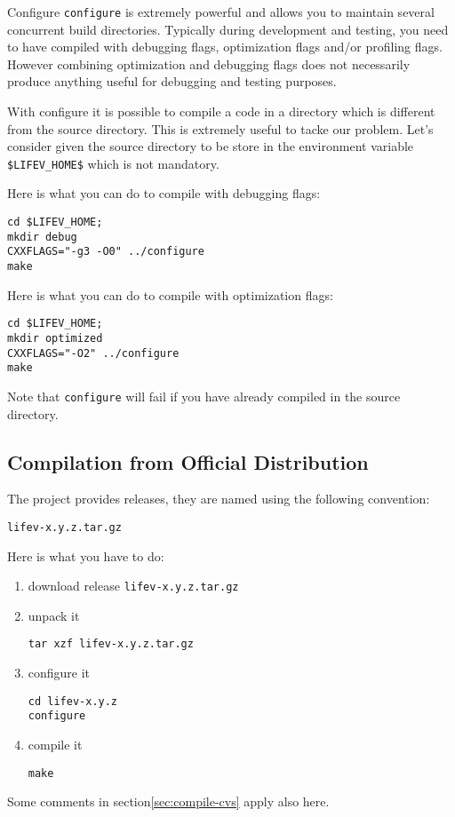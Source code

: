 \begin{hint}{Configure}
  \verb!configure! is extremely powerful and allows you to maintain
  several concurrent build directories. Typically during development
  and testing, you need to have \lifev compiled with debugging flags,
  optimization flags and/or profiling flags. However combining
  optimization and debugging flags does not necessarily produce
  anything useful for debugging and testing purposes.
  
  With configure it is possible to compile a code in a directory which
  is different from the source directory. This is extremely useful to
  tacke our problem. Let's consider given the source directory to be
  store in the environment variable \verb!$LIFEV_HOME$! which is not
  mandatory.

Here is what you can do to compile with debugging flags:
\begin{verbatim}
cd $LIFEV_HOME;
mkdir debug
CXXFLAGS="-g3 -O0" ../configure
make
\end{verbatim}

Here is what you can do to compile with optimization flags:
\begin{verbatim}
cd $LIFEV_HOME;
mkdir optimized
CXXFLAGS="-O2" ../configure
make
\end{verbatim}

Note that \verb!configure! will fail if you have already compiled
\lifev in the source directory.
\end{hint}


\subsection{Compilation from Official Distribution}

The \lifev project provides releases, they are named using the following convention:
\begin{center}
\verb!lifev-x.y.z.tar.gz!
\end{center}

Here is what you have to do:

\begin{enumerate}
\item download \lifev release \verb!lifev-x.y.z.tar.gz!
\item unpack it
\begin{verbatim}
tar xzf lifev-x.y.z.tar.gz
\end{verbatim}
\item configure it
\begin{verbatim}
cd lifev-x.y.z
configure
\end{verbatim}
\item compile it
\begin{verbatim}
make
\end{verbatim}
\end{enumerate}

Some comments in section\ref{sec:compile-cvs} apply also here.


 
%
%
